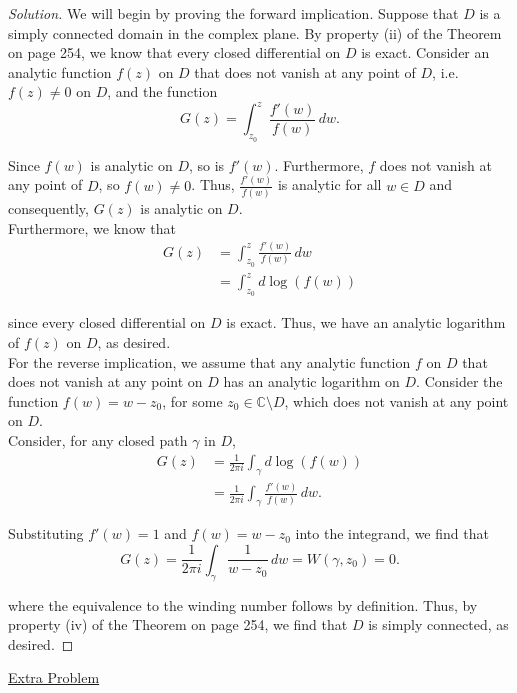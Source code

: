 \documentclass[11pt]{article}
\newenvironment{solution}
  {\renewcommand\qedsymbol{$\blacksquare$}\begin{proof}[Solution]}
  {\end{proof}}
\theoremstyle{definition}
\begin{document}
\begin{solution}
We will begin by proving the forward implication. Suppose that $D$ is a simply connected domain in the complex plane. By property (ii) of the Theorem on page 254, we know that every closed differential on $D$ is exact. Consider an analytic function $f(z)$ on $D$ that does not vanish at any point of $D$, i.e. $f(z) \neq 0$ on $D$, and the function
\[ G(z) = \int_{z_0}^z \frac{f'(w)}{f(w)} \, dw.\]

Since $f(w)$ is analytic on $D$, so is $f'(w)$. Furthermore, $f$ does not vanish at any point of $D$, so $f(w) \neq 0$. Thus, $\frac{f'(w)}{f(w)}$ is analytic for all $w \in D$ and consequently, $G(z)$ is analytic on $D$. \\

Furthermore, we know that
\begin{align*} G(z) &= \int_{z_0}^z \frac{f'(w)}{f(w)} \, dw \\
&= \int_{z_0}^z d\log(f(w)) \end{align*}

since every closed differential on $D$ is exact. Thus, we have an analytic logarithm of $f(z)$ on $D$, as desired. \\

For the reverse implication, we assume that any analytic function $f$ on $D$ that does not vanish at any point on $D$ has an analytic logarithm on $D$. Consider the function $f(w) = w - z_0$, for some $z_0 \in \mathbb{C} \setminus D$, which does not vanish at any point on $D$. \\

Consider, for any closed path $\gamma$ in $D$, \begin{align*}
G(z) &= \frac{1}{2\pi i}\int_{\gamma} d\log(f(w)) \\
&= \frac{1}{2\pi i}\int_{\gamma} \frac{f'(w)}{f(w)} \, dw.
\end{align*}

Substituting $f'(w) = 1$ and $f(w) = w - z_0$ into the integrand, we find that
\[ G(z) = \frac{1}{2\pi i} \int_{\gamma} \frac{1}{w-z_0} \, dw = W(\gamma, z_0) = 0.\]

where the equivalence to the winding number follows by definition. Thus, by property (iv) of the Theorem on page 254, we find that $D$ is simply connected, as desired.
\end{solution}

\newpage

\underline{Extra Problem}\\
\end{document}
